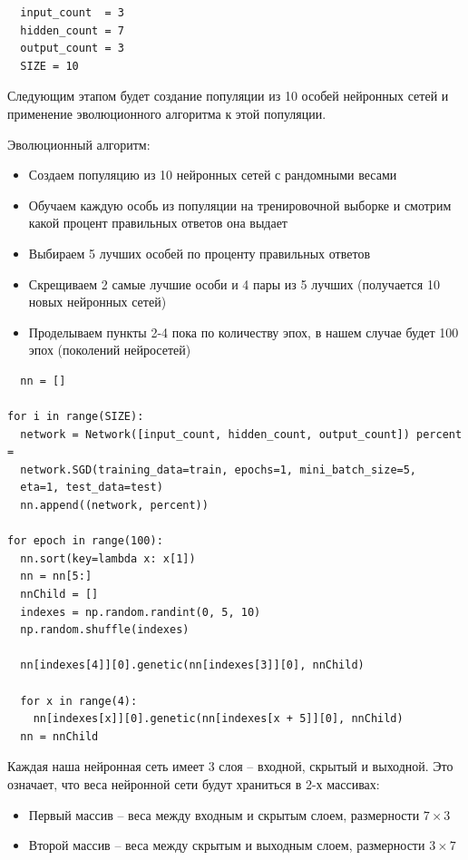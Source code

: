 \begin{lstlisting}
  input_count  = 3 
  hidden_count = 7 
  output_count = 3   
  SIZE = 10 
\end{lstlisting}

Следующим этапом будет создание популяции из 10 особей нейронных сетей и применение эволюционного алгоритма к этой популяции.

Эволюционный алгоритм:
\begin{itemize}
  \item Создаем популяцию из 10 нейронных сетей с рандомными весами
  \item Обучаем каждую особь из популяции на тренировочной выборке и смотрим какой процент правильных ответов она выдает
  \item Выбираем 5 лучших особей по проценту правильных ответов
  \item Скрещиваем 2 самые лучшие особи и 4 пары из 5 лучших (получается 10 новых нейронных сетей)
  \item Проделываем пункты 2-4 пока по количеству эпох, в нашем случае будет 100 эпох (поколений нейросетей)
\end{itemize}

\begin{lstlisting}
  nn = []

for i in range(SIZE):
  network = Network([input_count, hidden_count, output_count]) percent =
  network.SGD(training_data=train, epochs=1, mini_batch_size=5,
  eta=1, test_data=test)
  nn.append((network, percent))

for epoch in range(100):
  nn.sort(key=lambda x: x[1])
  nn = nn[5:] 
  nnChild = []
  indexes = np.random.randint(0, 5, 10)
  np.random.shuffle(indexes) 
 
  nn[indexes[4]][0].genetic(nn[indexes[3]][0], nnChild) 

  for x in range(4):
    nn[indexes[x]][0].genetic(nn[indexes[x + 5]][0], nnChild)
  nn = nnChild
\end{lstlisting}

Каждая наша нейронная сеть имеет 3 слоя – входной, скрытый и выходной. Это означает, что веса нейронной сети будут храниться в 2-х массивах:

\begin{itemize}
  \item Первый массив – веса между входным и скрытым слоем, размерности $7\times3$
  \item Второй массив – веса между скрытым и выходным слоем, размерности $3\times7$
\end{itemize}

